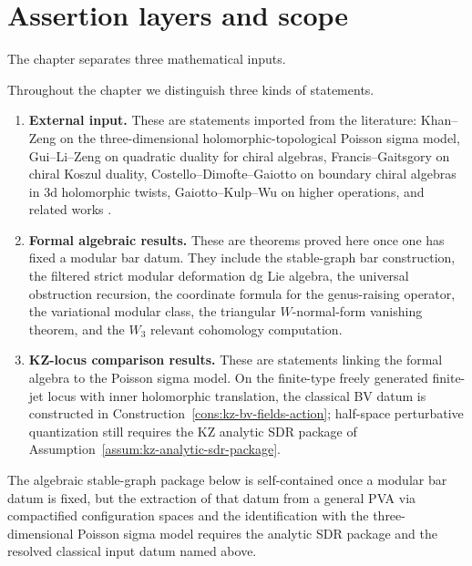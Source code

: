 \section{Assertion layers and scope}

The chapter separates three mathematical inputs.

\begin{convention}
Throughout the chapter we distinguish three kinds of statements.
\begin{enumerate}[leftmargin=2.4em]
\item \textbf{External input.} These are statements imported from the literature:
Khan--Zeng on the three-dimensional holomorphic-topological Poisson sigma model,
Gui--Li--Zeng on quadratic duality for chiral algebras, Francis--Gaitsgory on chiral
Koszul duality, Costello--Dimofte--Gaiotto on boundary chiral algebras in 3d
holomorphic twists, Gaiotto--Kulp--Wu on higher operations, and related works
\cite{KZ25,GLZ22,FG12,CDG20,GKW25}.
\item \textbf{Formal algebraic results.} These are theorems proved here once one
has fixed a modular bar datum. They include the stable-graph bar construction, the
filtered strict modular deformation dg Lie algebra, the universal obstruction recursion, the coordinate
formula for the genus-raising operator, the variational modular class, the triangular
$W$-normal-form vanishing theorem, and the $W_3$ relevant cohomology computation.
\item \textbf{KZ-locus comparison results.} These are statements linking the formal
algebra to the Poisson sigma model. On the finite-type freely generated
finite-jet locus with inner holomorphic translation, the classical BV
datum is constructed in Construction~\ref{cons:kz-bv-fields-action};
half-space perturbative quantization still requires the KZ analytic SDR
package of Assumption~\ref{assum:kz-analytic-sdr-package}.
\end{enumerate}
\end{convention}

\begin{remark}
The algebraic stable-graph
package below is self-contained once a modular bar datum is fixed, but the extraction of
that datum from a general PVA via compactified configuration spaces and the identification
with the three-dimensional Poisson sigma model requires the analytic SDR package and the
resolved classical input datum named above.
\end{remark}

